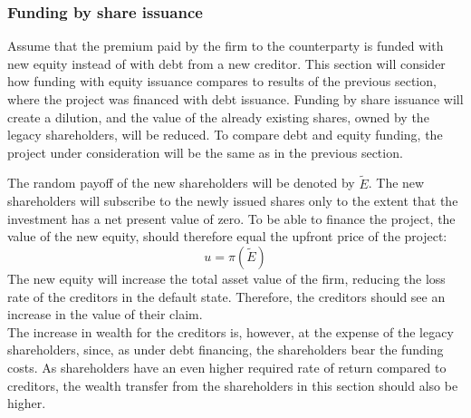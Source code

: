 \documentclass[main.tex]{subfiles}
\begin{document}
    \subsubsection{Funding by share issuance}
    \label{sec:example-equity-issuance}
        Assume that the premium paid by the firm to the counterparty is funded with new equity instead of with debt from a new creditor. 
        This section will consider how funding with equity issuance
        compares to results of the previous section, where the project was financed with debt issuance.
        Funding by share issuance will create a dilution, and the value of the already existing shares, owned by the legacy shareholders, will be reduced. 
        To compare debt and equity funding, 
        the project under consideration will be the same as in the previous section.

        The random payoff of the new shareholders will be denoted by $\tilde{E}$.
        The new shareholders will subscribe to the newly issued shares 
        only to the extent that the investment has a net present value of zero.
        To be able to finance the project, the value of the new equity,
        should therefore equal the upfront price of the project:
        \begin{equation}\label{eqn:derivative-zero-npv}
            u = \pi(\tilde{E})
        \end{equation}
        The new equity will increase the total asset value of the firm,
        reducing the loss rate of the creditors in the default state.
        Therefore, the creditors should see an increase in the value of their claim.\\
        The increase in wealth for the creditors is, however, at the expense of the legacy shareholders,
        since, as under debt financing, the shareholders bear the funding costs.
        As shareholders have an even higher required rate of return compared to creditors,
        the wealth transfer from the shareholders in this section should also be higher.
\end{document}
